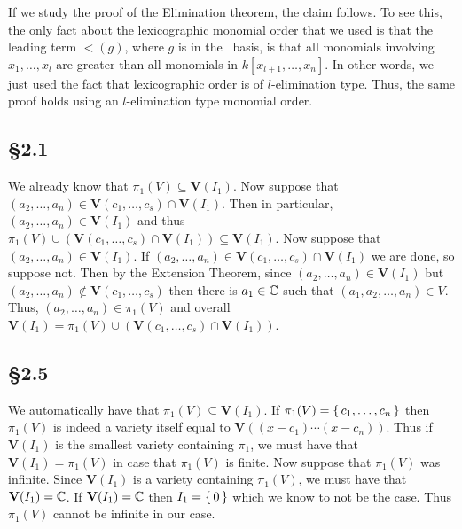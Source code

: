 \documentclass[letterpaper]{article}
\begin{document}
If we study the proof of the Elimination theorem, the claim follows.
To see this, the only fact about the lexicographic monomial order that we used is that the leading term $\lt(g)$, where $g$ is in the \Grobner\ basis, is that all monomials involving $x_{1}, \ldots, x_{l}$ are greater than all monomials in $k[x_{l + 1}, \ldots, x_{n}]$.
In other words, we just used the fact that lexicographic order is of $l$-elimination type.
Thus, the same proof holds using an $l$-elimination type monomial order.

\subsection*{\S 2.1}

We already know that $\pi_{1}(V) \subseteq \mathbf{V}(I_{1})$.
Now suppose that $(a_{2}, \ldots, a_{n}) \in \mathbf{V}(c_{1}, \ldots, c_{s}) \cap \mathbf{V}(I_{1})$.
Then in particular, $(a_{2}, \ldots, a_{n}) \in \mathbf{V}(I_{1})$ and thus $\pi_{1}(V) \cup (\mathbf{V}(c_{1}, \ldots, c_{s}) \cap \mathbf{V}(I_{1})) \subseteq \mathbf{V}(I_{1})$.
Now suppose that $(a_{2}, \ldots, a_{n}) \in \mathbf{V}(I_{1})$.
If $(a_{2}, \ldots, a_{n}) \in \mathbf{V}(c_{1}, \ldots, c_{s}) \cap \mathbf{V}(I_{1})$ we are done, so suppose not.
Then by the Extension Theorem, since $(a_{2}, \ldots, a_{n}) \in \mathbf{V}(I_{1})$ but $(a_{2}, \ldots, a_{n}) \notin \mathbf{V}(c_{1}, \ldots, c_{s})$ then there is $a_{1} \in \mathbb{C}$ such that $(a_{1}, a_{2}, \ldots, a_{n}) \in V$.
Thus, $(a_{2}, \ldots, a_{n}) \in \pi_{1}(V)$ and overall $\mathbf{V}(I_{1}) = \pi_{1}(V) \cup (\mathbf{V}(c_{1}, \ldots, c_{s}) \cap \mathbf{V}(I_{1}))$.

\subsection*{\S 2.5}

We automatically have that $\pi_{1}(V) \subseteq \mathbf{V}(I_{1})$.
If $\pi_{1}(V) = \set{c_{1}, \ldots, c_{n}}$ then $\pi_{1}(V)$ is indeed a variety itself equal to $\mathbf{V}((x - c_{1}) \cdots (x - c_{n}))$.
Thus if $\mathbf{V}(I_{1})$ is the smallest variety containing $\pi_{1}$, we must have that $\mathbf{V}(I_{1}) = \pi_{1}(V)$ in case that $\pi_{1}(V)$ is finite.
Now suppose that $\pi_{1}(V)$ was infinite.
Since $\mathbf{V}(I_{1})$ is a variety containing $\pi_{1}(V)$, we must have that $\mathbf{V}(I_{1}) = \mathbb{C}$.
If $\mathbf{V}(I_{1}) = \mathbb{C}$ then $I_{1} = \set{0}$ which we know to not be the case.
Thus $\pi_{1}(V)$ cannot be infinite in our case.
\end{document}
